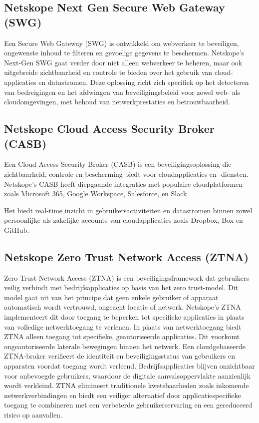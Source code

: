 \subsection{Netskope Next Gen Secure Web Gateway (SWG)}
Een Secure Web Gateway (SWG) is ontwikkeld om webverkeer te beveiligen, ongewenste inhoud te filteren en gevoelige gegevens te beschermen. Netskope's Next-Gen SWG gaat verder door niet alleen webverkeer te beheren, maar ook uitgebreide zichtbaarheid en controle te bieden over het gebruik van cloud-applicaties en datastromen.
Deze oplossing richt zich specifiek op het detecteren van bedreigingen en het afdwingen van beveiligingsbeleid voor zowel web- als cloudomgevingen, met behoud van netwerkprestaties en betrouwbaarheid.~\autocite{Netskope2025-3}

\subsection{Netskope Cloud Access Security Broker (CASB)}
Een Cloud Access Security Broker (CASB) is een beveiligingsoplossing die zichtbaarheid, controle en bescherming biedt voor cloudapplicaties en -diensten. Netskope's CASB heeft diepgaande integraties met populaire cloudplatformen zoals Microsoft 365, Google Workspace, Salesforce, en Slack.

Het biedt real-time inzicht in gebruikersactiviteiten en datastromen binnen zowel persoonlijke als zakelijke accounts van cloudapplicaties zoals Dropbox, Box en GitHub.~\autocite{Netskope2025-4}

\subsection{Netskope Zero Trust Network Access (ZTNA)}
Zero Trust Network Access (ZTNA) is een beveiligingsframework dat gebruikers veilig verbindt met bedrijfsapplicaties op basis van het zero trust-model. Dit model gaat uit van het principe dat geen enkele gebruiker of apparaat automatisch wordt vertrouwd, ongeacht locatie of netwerk. Netskope’s ZTNA implementeert dit door toegang te beperken tot specifieke applicaties in plaats van volledige netwerktoegang te verlenen. In plaats van netwerktoegang biedt ZTNA alleen toegang tot specifieke, geautoriseerde applicaties. Dit voorkomt ongeautoriseerde laterale bewegingen binnen het netwerk. Een cloudgebaseerde ZTNA-broker verifieert de identiteit en beveiligingsstatus van gebruikers en apparaten voordat toegang wordt verleend. Bedrijfsapplicaties blijven onzichtbaar voor onbevoegde gebruikers, waardoor de digitale aanvalsoppervlakte aanzienlijk wordt verkleind. ZTNA elimineert traditionele kwetsbaarheden zoals inkomende netwerkverbindingen en biedt een veiliger alternatief door applicatiespecifieke toegang te combineren met een verbeterde gebruikerservaring en een gereduceerd risico op aanvallen.~\autocite{Netskope2025-5}

